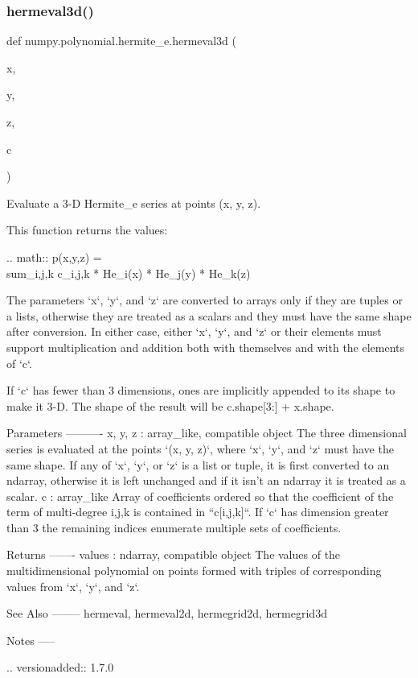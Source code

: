 \subsubsection{\texorpdfstring{hermeval3d()}{hermeval3d()}}
{\footnotesize\ttfamily def numpy.\+polynomial.\+hermite\+\_\+e.\+hermeval3d (\begin{DoxyParamCaption}\item[{}]{x,  }\item[{}]{y,  }\item[{}]{z,  }\item[{}]{c }\end{DoxyParamCaption})}

\begin{DoxyVerb}Evaluate a 3-D Hermite_e series at points (x, y, z).

This function returns the values:

.. math:: p(x,y,z) = \\sum_{i,j,k} c_{i,j,k} * He_i(x) * He_j(y) * He_k(z)

The parameters `x`, `y`, and `z` are converted to arrays only if
they are tuples or a lists, otherwise they are treated as a scalars and
they must have the same shape after conversion. In either case, either
`x`, `y`, and `z` or their elements must support multiplication and
addition both with themselves and with the elements of `c`.

If `c` has fewer than 3 dimensions, ones are implicitly appended to its
shape to make it 3-D. The shape of the result will be c.shape[3:] +
x.shape.

Parameters
----------
x, y, z : array_like, compatible object
    The three dimensional series is evaluated at the points
    `(x, y, z)`, where `x`, `y`, and `z` must have the same shape.  If
    any of `x`, `y`, or `z` is a list or tuple, it is first converted
    to an ndarray, otherwise it is left unchanged and if it isn't an
    ndarray it is  treated as a scalar.
c : array_like
    Array of coefficients ordered so that the coefficient of the term of
    multi-degree i,j,k is contained in ``c[i,j,k]``. If `c` has dimension
    greater than 3 the remaining indices enumerate multiple sets of
    coefficients.

Returns
-------
values : ndarray, compatible object
    The values of the multidimensional polynomial on points formed with
    triples of corresponding values from `x`, `y`, and `z`.

See Also
--------
hermeval, hermeval2d, hermegrid2d, hermegrid3d

Notes
-----

.. versionadded:: 1.7.0\end{DoxyVerb}
 \mbox{\label{namespacenumpy_1_1polynomial_1_1hermite__e_afd2be39cbb6a5bf5c4050c36d17102a6}} 

